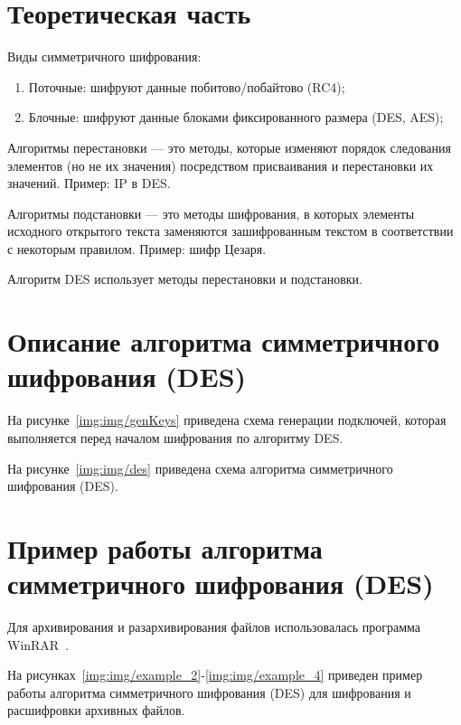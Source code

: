 \chapter{Теоретическая часть}

Виды симметричного шифрования:
\begin{enumerate}[label={\arabic*)}]
	\item Поточные: шифруют данные побитово/побайтово (RC4);
	\item Блочные: шифруют данные блоками фиксированного размера (DES, AES);	
\end{enumerate}

Алгоритмы перестановки — это методы, которые изменяют порядок следования элементов (но не их значения) посредством присваивания и перестановки их значений. Пример: IP в DES.

Алгоритмы подстановки — это методы шифрования, в которых элементы исходного открытого текста заменяются зашифрованным текстом в соответствии с некоторым правилом. Пример: шифр Цезаря.

Алгоритм DES использует методы перестановки и подстановки.

\chapter{Описание алгоритма симметричного шифрования (DES)}

На рисунке~\ref{img:img/genKeys} приведена схема генерации подключей, которая выполняется перед началом шифрования по алгоритму DES.

\FloatBarrier
{}
\FloatBarrier

\clearpage
На рисунке~\ref{img:img/des} приведена схема алгоритма симметричного шифрования (DES).

\FloatBarrier
{}
\FloatBarrier


\chapter{Пример работы алгоритма симметричного шифрования (DES)}

Для архивирования и разархивирования файлов использовалась программа WinRAR~\cite{winrar}.

На рисунках~\ref{img:img/example_2}-\ref{img:img/example_4} приведен пример работы алгоритма симметричного шифрования (DES) для шифрования и расшифровки архивных файлов.

